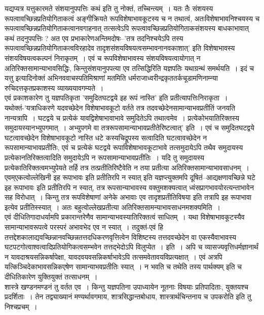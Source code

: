 {यद्यप्यत्र यत्तुकारमते संशयानुपपत्तिः कथं इति तु नोक्तं, तच्चिन्त्यम्~। यतः तैः \-संशयस्य रूपत्वावच्छिन्नप्रतियोगिताकत्वं अङ्गीक्रियते  रूपविशेषाभावकूटस्य च न तथात्वं, अतः\break विशेषाभावनिश्चयस्य च रूपत्वावच्छिन्नप्रतियोगिताकत्वानवगाहनात् तत्सत्वेऽपि रूपत्वावच्छिन्नप्रतियोगिताकसंशयस्य बाधकाभावात् कथं तदनुपपत्तिः ? अत एव प्रभाकारेण\break अन्तिमदोषः--’तत्र तदनिश्चयेऽपि तस्य रूपत्वावच्छिन्नप्रतियोगिताकत्वविरहादेव तादृशसंशयविषयत्वसम्भावनानवकाशात्’ इति विशेषाभावस्य संशयविषयत्वकल्पनं निराकृतम्~। एवं च रूपविशेषाभावस्य संशयविषयत्वायोगात् न अतिरिक्तसामान्याभावसिद्धिः, किन्तु\break संशयानुपपत्या एव तत्सिद्धिरिति यज्ञपतिः यथाग्रन्थं समर्थयति~। इदं च यत्तु इत्यादिनोक्तं अभिनववाचस्पतिमिश्राणां मतमिति धर्मराजाध्वरीन्द्रकृततर्कचूडामणिनाम्न्या रुचिदत्तकृतप्रकाशस्य व्याख्ययावगम्यते~। 
~\\[0.1cm]
एवं प्रकाशकारेण तु यज्ञपतिकृता ’समुदितघटद्वये इह रूपं नास्ति’ इति प्रतीत्यापत्तिः\break निराकृता~। यथोक्तं-’यत्राधिकरणे यदवच्छेदेन विशेषाभावकूटो वर्तते तत्र तदवच्छेदेन\break सामान्याभवप्रतीतिं जनयति नान्यत्रापि~। घटद्वये च प्रत्येकं यावद्विशेषाभावाभावे समुदितेऽपि तथात्वमेव~। प्रत्येकोभयातिरिक्तस्य समुदायस्यानभ्युपगमात्~। अभ्युपगमे वा तत्र\break रूपसामान्याभावप्रतीतेरिष्टत्वात्’ इति~। एवं च समुदितघटद्वये घटत्वावच्छेदेन विशेषाभावकूटो नास्ति धटे कस्यचिद्रूपस्य सत्वादिति घटत्वावच्छेदेन न रूपसामान्याभावप्रतीतिः, एवं च प्रत्येकं घटद्वये रूपाविशेषाभावकूटाभावे तत्समुदायेऽपि तथैव समुदायस्य प्रत्येकानतिरिक्तत्वादिति समुदायेऽपि न रूपसामान्याभावप्रतीतिः~। यदि तु  समुदायस्य प्रत्येकातिरिक्तत्वमभ्युपेयते तर्हि तत्र तत्प्रतीतिरिष्टैवेति न तया प्रतीत्या अतिरिक्तसामान्याभावसाधनम्~। एवम्\break एकत्वोल्लेखिनी इह रूपाभावः इति प्रतीतिरपि न स्यात् इति यज्ञप्त्युक्तमपि दूषितं–आद्यक्षणा\-वच्छिन्ने घटे इह रूपाभावः इति प्रतीतिरपि न स्यात्, तत्र रूपसान्याभावस्य वक्तुमशक्यत्वात् ध्वंसप्रागभावयोरत्यन्ताभावेन सह विरोधात्~। किन्तु तत्र रूपविशेषाणां अनेके  अभावाः एव तादृशप्रतीतिविषया इति तत्रापि इह रूपाभावा इत्येव प्रतीतिस्स्यात्~। अतः बहुत्वोल्लेखप्रतीत्या अतिरिक्तसामन्याभावसाधनमशक्यमिति~। 
~\\[0.1cm]
एवं दीधितिगादाधर्यामपि प्रकारान्तरेणैव सामान्याभवस्यातिरिक्तत्वं साधितम्~। यथा विशेषाभावकूटस्यैव सामान्याभावरूपत्वे परस्परं अभावभेद एव न स्यात्~। तदुक्तं-एवं हि तत्तद्देशकालाद्यवच्छिन्नानवच्छिन्नतत्तदधिकरणवृत्तित्वेन विशिष्टस्य तत्तदवच्छेदेन वा एकस्यैवाभावस्य घटपटगोत्वाश्वत्वादिप्रतियोगिकत्वसम्भवेन तत्तद्भेदोऽपि विलुप्येत~। इति~। अपि च व्यासज्यवृत्तिधर्मज्ञानार्थं न यावदाश्रयसन्निकर्षापेक्षा, यावदवयवसन्निकर्षाभावेऽपि तत्समवेतावयविप्रत्यक्षात्~। एवं अत्रपि यत्किञ्चिदेकाभावसन्निकएषेण सामान्याभवप्रतीतिः स्यात्~। न भवति च तथेति तस्य पार्थक्यम् इति च दीधितिकारेण युक्तियुक्तं तत्साधनम्~। 
~\\[0.1cm]
शास्त्रे खण्डनमण्डनं तु वर्तत एव~। किन्तु यज्ञपतिना उपाध्यायेन नूतनाः विषयाः प्रतिपादिताः, युक्तयश्च  प्रदर्शिताः~। तेन तद्व्याख्यानं मण्यर्थावगमाय, शात्रसिद्धान्तबोधाय, शास्त्रार्थचिन्तनाय च उपकरोति इति तु निश्चप्रचम्~। 

}
